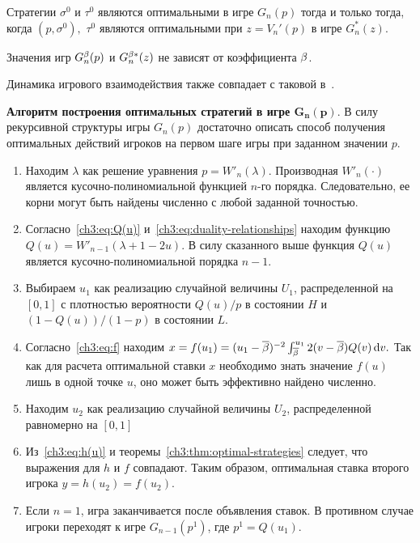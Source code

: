 \begin{theorem}\label{ch3:thm:optimal-strategies}
  Стратегии $\sigma^0$ и $\tau^0$ являются оптимальными в игре $G_n(p)$ тогда и только тогда, когда $(p, \sigma^0),$ $\tau^0$ являются оптимальными при $z = V_n'(p)$ в игре $G_n^*(z)$.
\end{theorem}

\begin{corollary}
  \label{ch3:cor:value-indep-beta}
  Значения игр $G^{\beta}_n(p)$ и $G^{\beta*}_n(z)$ не зависят от коэффициента $\beta$.
\end{corollary}

Динамика игрового взаимодействия также совпадает с таковой в~\cite{demeyer02}.

\noindent
\textbf{Алгоритм построения оптимальных стратегий в игре $\mathbf{G_n(p)}$}.
В силу рекурсивной структуры игры $G_n(p)$ достаточно описать способ получения оптимальных действий игроков на первом шаге игры при заданном значении $p$.
\begin{enumerate}
\item
  Находим $\lambda$ как решение уравнения 
  $
    p = W'_n(\lambda).
  $
  Производная $W'_n(\cdot)$ является кусочно-полиномиальной функцией $n$-го порядка.
  Следовательно, ее корни могут быть найдены численно с любой заданной точностью.
\item
  Согласно~\eqref{ch3:eq:Q(u)} и~\eqref{ch3:eq:duality-relationships} находим функцию 
  $
    Q(u) = W'_{n-1}(\lambda + 1 - 2u).
  $
  В силу сказанного выше функция $Q(u)$ является кусочно-полиномиальной порядка $n-1$.
\item
  Выбираем $u_1$ как реализацию случайной величины $U_1$, распределенной на $[0, 1]$ с плотностью вероятности $Q(u)/p$ в состоянии $H$ и $\left(1 - Q(u)\right)/(1-p)$ в состоянии $L$.
\item
  Согласно~\eqref{ch3:eq:f} находим 
  $
    x = f(u_1) = (u_1 - {{\overline{\beta}}})^{-2} \int_{{{\overline{\beta}}}}^{u_1} 2 (v - {{\overline{\beta}}}) Q(v) \mathop{}\!\mathrm{d} v.
  $
  Так как для расчета оптимальной ставки $x$ необходимо знать значение $f(u)$ лишь в одной точке $u$, оно может быть эффективно найдено численно.
\item
  Находим $u_2$ как реализацию случайной величины $U_2$, распределенной равномерно на $[0, 1]$
\item
  Из~\eqref{ch3:eq:h(u)} и теоремы~\ref{ch3:thm:optimal-strategies} следует, что выражения для $h$ и $f$ совпадают.
  Таким образом, оптимальная ставка второго игрока $y = h(u_2) = f(u_2)$.
\item
  Если $n = 1$, игра заканчивается после объявления ставок. В противном случае игроки переходят к игре $G_{n-1}(p^1)$, где $p^1 = Q(u_1)$.
\end{enumerate}

